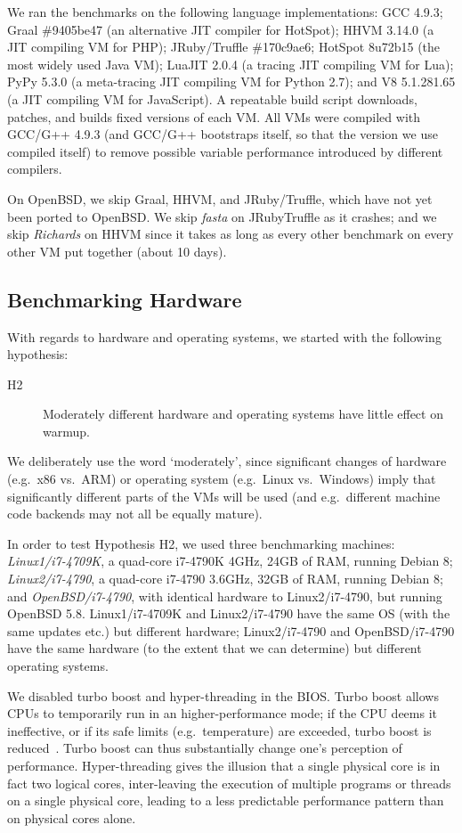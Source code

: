 \documentclass[preprint,numbers,10pt]{sigplanconf}
\newcommand{\hyptwo}{H2\xspace}
\newcommand{\richards}{\emph{Richards}\xspace}
\newcommand{\fasta}{\emph{fasta}\xspace}
\newcommand{\bencherthree}{Linux1/i7-4709K\xspace}
\newcommand{\bencherfive}{Linux2/i7-4790\xspace}
\newcommand{\benchersix}{OpenBSD/i7-4790\xspace}
\begin{document}
We ran the benchmarks on the following language implementations: GCC 4.9.3;
Graal \#9405be47 (an alternative JIT compiler for HotSpot); HHVM 3.14.0 (a JIT
compiling VM for PHP); JRuby/Truffle \#170c9ae6; HotSpot 8u72b15 (the most widely used Java
VM); LuaJIT 2.0.4 (a tracing JIT compiling VM for Lua); PyPy 5.3.0 (a
meta-tracing JIT compiling VM for Python 2.7); and V8 5.1.281.65 (a JIT
compiling VM for JavaScript). A repeatable build script downloads, patches,
and builds fixed versions of each VM. All VMs were compiled with GCC/G++ 4.9.3
(and GCC/G++ bootstraps itself, so that the version we use compiled itself)
to remove possible variable performance introduced by different compilers.

On OpenBSD, we skip Graal, HHVM, and JRuby/Truffle, which have not yet been
ported to OpenBSD. We skip \fasta on JRubyTruffle as it crashes;
and we skip \richards on HHVM since it takes as long as every other benchmark
on every other VM put together (about 10 days).


\subsection{Benchmarking Hardware}

With regards to hardware and operating systems, we started with the
following hypothesis:
\begin{description}
  \item[\hyptwo] Moderately different hardware and operating systems have little effect on warmup.
\end{description}
We deliberately use the word `moderately', since significant changes of hardware
(e.g.~x86 vs.~ARM) or operating system (e.g.~Linux vs.~Windows) imply that
significantly different parts of the VMs will be used (and e.g.~different machine
code backends may not all be equally mature).

In order to test Hypothesis H2, we used three benchmarking machines: \emph{\bencherthree}, a quad-core i7-4790K
4GHz, 24GB of RAM, running Debian 8; \emph{\bencherfive}, a quad-core i7-4790
3.6GHz, 32GB of RAM, running Debian 8; and \emph{\benchersix}, with identical
hardware to \bencherfive, but running OpenBSD 5.8. \bencherthree and \bencherfive
have the same OS (with the same updates etc.) but different hardware; \bencherfive
and \benchersix have the same hardware (to the extent that we can determine)
but different operating systems.

We disabled turbo boost and hyper-threading in the BIOS. Turbo boost
allows CPUs to temporarily run in an higher-performance
mode; if the CPU deems it ineffective, or if its safe limits (e.g.~temperature) are exceeded,
turbo boost is reduced~\cite{charles09turboboost}. Turbo boost
can thus substantially change one's
perception of performance. Hyper-threading gives the illusion that a single
physical core is in fact two logical cores, inter-leaving the
execution of multiple programs or threads on a single physical core,
leading to a less predictable performance pattern
than on physical cores alone.
\end{document}
